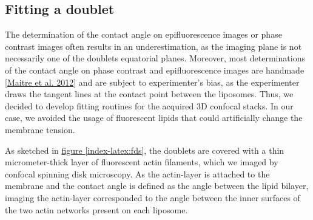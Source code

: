\documentclass[A4paperpaper,11pt,english]{sphinxmanual}
\begin{document}
\subsection{Fitting a doublet}
\label{index-latex:fitting-a-doublet}
The determination of the contact angle on epifluorescence images or phase contrast
images often results in an underestimation, as the imaging plane is not necessarily one of the doublets
equatorial planes. Moreover, most determinations of the contact angle on phase
contrast and epifluorescence images are handmade {\hyperref[index-latex:maitre2012]{{[}Maitre et al. 2012{]}}} and
are subject to experimenter’s bias, as the experimenter draws the tangent lines at the
contact point between the liposomes. Thus, we decided to develop fitting routines for the acquired
3D confocal stacks. In our case, we avoided the usage of
fluorescent lipids that could artificially change the membrane tension.

As sketched in \hyperref[index-latex:fds]{figure  \ref*{index-latex:fds}}, the doublets are covered with a
thin micrometer-thick layer of fluorescent actin filaments, which we
imaged by confocal spinning disk microscopy. As the actin-layer is attached to the membrane
and the contact angle is defined as the angle between the lipid bilayer, imaging the actin-layer corresponded
to the angle between the inner surfaces of the two actin networks present on each liposome.
\end{document}
